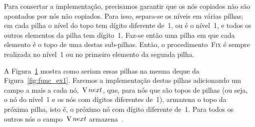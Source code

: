 \documentclass[main.tex]{subfiles}
\begin{document}
Para consertar a implementação, precisamos garantir que os nós copiados não são apontados por nós não copiados. Para isso, separa-se os níveis em várias pilhas; em cada pilha o nível do topo tem dígito diferente de~1, ou é o nível~1, e todos os outros elementos da pilha tem dígito~1. Faz-se então uma pilha em que cada elemento é o topo de uma destas sub-pilhas. Então, o procedimento~\textsc{Fix} é sempre realizada no nível~1 ou no primeiro elemento da segunda pilha.

\begin{figure}
\centering
{}
\caption{} \label{fig:func_ex2}
\end{figure}

A Figura~\ref{fig:func_ex2} mostra como seriam essas pilhas na mesma deque da Figura~\ref{fig:func_ex1}. Faremos a implementação destas pilhas adicionando um campo a mais a cada nó,~$\operatorname{V}{next}$, que, para nós que são topos de pilhas (ou seja, o nó do nível~1 e os nós com dígitos diferentes de~1), armazena o topo da próxima pilha, isto é, o próximo nó com dígito diferente de~1. Para todos os outros nós o campo~$\operatorname{V}{next}$ armazena~.
\end{document}
